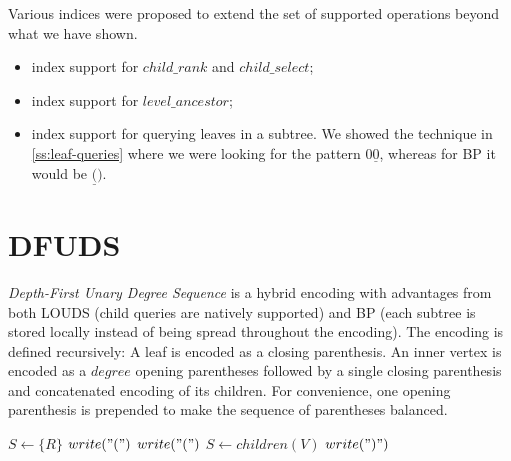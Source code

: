 Various indices were proposed to extend the set of supported operations beyond what we have shown.
\begin{itemize}
	\item index support for $child\_rank$ and $child\_select$;
	\item index support for $level\_ancestor$;
	\item index support for querying leaves in a subtree.
	We showed the technique in \ref{ss:leaf-queries} where we were looking for the pattern $0\underline{0}$, whereas for BP it would be $\underline{(})$.
\end{itemize}

\section{DFUDS}

\emph{Depth-First Unary Degree Sequence} is a hybrid encoding with advantages from both LOUDS (child queries are natively supported) and BP (each subtree is stored locally instead of being spread throughout the encoding).
The encoding is defined recursively:
A leaf is encoded as a closing parenthesis.
An inner vertex is encoded as a $degree$ opening parentheses followed by a single closing parenthesis and concatenated encoding of its children.
For convenience, one opening parenthesis is prepended to make the sequence of parentheses balanced.


\begin{algorithmic}
	\State $S \gets \{R\}$ 
	\State $write("(")$
				\State $write("(")$
			\EndFor
			\State $ S \gets children(V)$
			\State $write(")")$
	\EndWhile
\EndFunction
\end{algorithmic}

